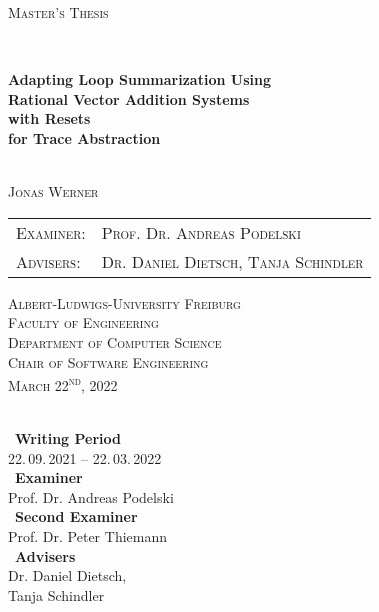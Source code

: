 \begin{titlepage}
	\begin{centering}
		
		{\scshape\Large Master's Thesis\par}
		
		
		\HorizontalLine \\[0.4cm]
		{\huge\bfseries Adapting Loop Summarization Using \\ Rational Vector Addition Systems \\ with Resets \\ for Trace Abstraction \par}
		\HorizontalLine \\[1.5cm]
		
		
		{\Large \scshape Jonas Werner}\\[5cm]
		
		
		\begin{tabular}[scshape]{>{\normalsize}l >{\normalsize}l}
			\scshape Examiner: & \scshape Prof. Dr. Andreas Podelski\\[0.3cm]
			\scshape Advisers: & \scshape Dr. Daniel Dietsch, Tanja Schindler  \\[1.2cm]
		\end{tabular}
		\vfill  %
		
		\large { \scshape
			Albert-Ludwigs-University Freiburg\\
			Faculty of Engineering\\
			Department of Computer Science\\
			Chair of Software Engineering \\[1cm]
			
			March 22\textsuperscript{nd}, 2022\\
		}
	\end{centering}
\end{titlepage}

\thispagestyle{empty}
\ \vfill \ \\  %
\
\textbf{Writing Period}            \smallskip{} \\
22.\,09.\,2021 -- 22.\,03.\,2022   \bigskip{} \\
\
\textbf{Examiner}                  \smallskip{} \\
Prof. Dr. Andreas Podelski                     \bigskip{} \\
\
\textbf{Second Examiner}                  \smallskip{} \\
Prof. Dr. Peter Thiemann        \bigskip{} \\
\
\textbf{Advisers}                  \smallskip{} \\
Dr. Daniel Dietsch, \\ Tanja Schindler
\pagebreak